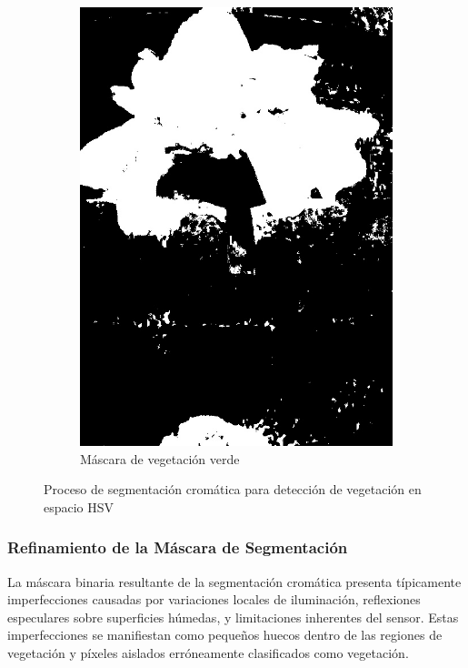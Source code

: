 \begin{figure}[H]
\begin{subfigure}[b]{0.48\textwidth}
    \includegraphics[width=\textwidth]{imagenes/clasificador_2_verde.jpg}
    \caption{Máscara de vegetación verde}
\end{subfigure}
\caption{Proceso de segmentación cromática para detección de vegetación en espacio HSV}
\label{fig:segmentacion_cromatica}
\end{figure}

\subsubsection{Refinamiento de la Máscara de Segmentación}

La máscara binaria resultante de la segmentación cromática presenta típicamente imperfecciones causadas por variaciones locales de iluminación, reflexiones especulares sobre superficies húmedas, y limitaciones inherentes del sensor. Estas imperfecciones se manifiestan como pequeños huecos dentro de las regiones de vegetación y píxeles aislados erróneamente clasificados como vegetación.

